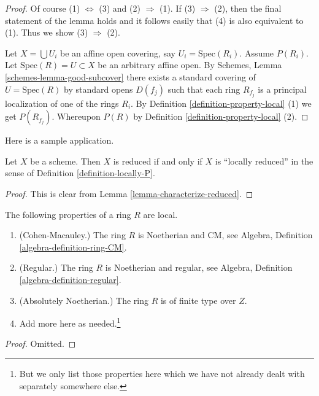 \begin{proof}
Of course (1) $\Leftrightarrow$ (3) and (2) $\Rightarrow$ (1).
If (3) $\Rightarrow$ (2), then the final statement of the lemma
holds and it follows easily that (4) is also equivalent to (1).
Thus we show (3) $\Rightarrow$ (2).

\medskip\noindent
Let $X = \bigcup U_i$ be an affine open covering, say
$U_i = \text{Spec}(R_i)$. Assume $P(R_i)$.
Let $\text{Spec}(R) = U \subset X$ be an arbitrary affine open.
By Schemes, Lemma \ref{schemes-lemma-good-subcover}
there exists a standard covering of $U = \text{Spec}(R)$ by
standard opens $D(f_j)$ such that each ring $R_{f_j}$ is a
principal localization of one of the rings $R_i$. By
Definition \ref{definition-property-local} (1) we get $P(R_{f_j})$.
Whereupon $P(R)$ by Definition \ref{definition-property-local} (2).
\end{proof}

\noindent
Here is a sample application.

\begin{lemma}
\label{lemma-reduced-is-locally-reduced}
Let $X$ be a scheme. Then $X$ is reduced if and only if $X$ is
``locally reduced'' in the sense of Definition \ref{definition-locally-P}.
\end{lemma}

\begin{proof}
This is clear from Lemma \ref{lemma-characterize-reduced}.
\end{proof}

\begin{lemma}
\label{lemma-properties-local}
The following properties of a ring $R$ are local.
\begin{enumerate}
\item (Cohen-Macauley.)
The ring $R$ is Noetherian and CM, see
Algebra, Definition \ref{algebra-definition-ring-CM}.
\item (Regular.)
The ring $R$ is Noetherian and regular, see
Algebra, Definition \ref{algebra-definition-regular}.
\item (Absolutely Noetherian.)
The ring $R$ is of finite type over $Z$.
\item Add more here as needed.\footnote{But we only list those properties
here which we have not already dealt with separately somewhere else.}
\end{enumerate}
\end{lemma}

\begin{proof}
Omitted.
\end{proof}
















